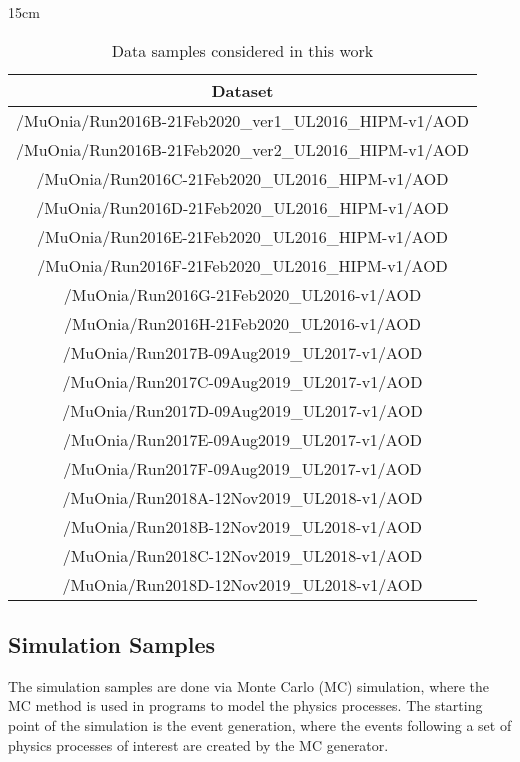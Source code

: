 \begin{table}[!htbp]{15cm}
  \caption{Data samples considered in this work}\label{tab:datasamples}
  \begin{tabular}{ c }
    Dataset \\ 
    \hline
    /MuOnia/Run2016B-21Feb2020\_ver1\_UL2016\_HIPM-v1/AOD \\
    /MuOnia/Run2016B-21Feb2020\_ver2\_UL2016\_HIPM-v1/AOD \\
    /MuOnia/Run2016C-21Feb2020\_UL2016\_HIPM-v1/AOD \\
    /MuOnia/Run2016D-21Feb2020\_UL2016\_HIPM-v1/AOD \\
    /MuOnia/Run2016E-21Feb2020\_UL2016\_HIPM-v1/AOD \\
    /MuOnia/Run2016F-21Feb2020\_UL2016\_HIPM-v1/AOD \\
    /MuOnia/Run2016G-21Feb2020\_UL2016-v1/AOD \\
    /MuOnia/Run2016H-21Feb2020\_UL2016-v1/AOD \\
    \hline
    /MuOnia/Run2017B-09Aug2019\_UL2017-v1/AOD \\
    /MuOnia/Run2017C-09Aug2019\_UL2017-v1/AOD \\
    /MuOnia/Run2017D-09Aug2019\_UL2017-v1/AOD \\
    /MuOnia/Run2017E-09Aug2019\_UL2017-v1/AOD \\
    /MuOnia/Run2017F-09Aug2019\_UL2017-v1/AOD \\
    \hline
    /MuOnia/Run2018A-12Nov2019\_UL2018-v1/AOD \\
    /MuOnia/Run2018B-12Nov2019\_UL2018-v1/AOD \\
    /MuOnia/Run2018C-12Nov2019\_UL2018-v1/AOD \\
    /MuOnia/Run2018D-12Nov2019\_UL2018-v1/AOD \\
  \end{tabular}
\end{table}

\subsection{Simulation Samples}

The simulation samples are done via Monte Carlo (MC) simulation, where the MC method is used in programs to model the physics processes. The starting point of the simulation is the event generation, where the events following a set of physics processes of interest are created by the MC generator.

